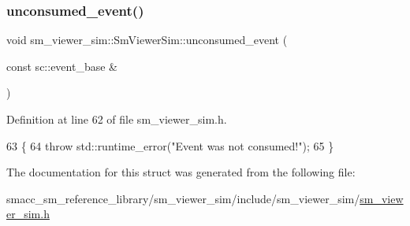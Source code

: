 \subsubsection{\texorpdfstring{unconsumed\+\_\+event()}{unconsumed\_event()}}
{\footnotesize\ttfamily void sm\+\_\+viewer\+\_\+sim\+::\+Sm\+Viewer\+Sim\+::unconsumed\+\_\+event (\begin{DoxyParamCaption}\item[{const sc\+::event\+\_\+base \&}]{ }\end{DoxyParamCaption})\hspace{0.3cm}{\ttfamily [inline]}}



Definition at line 62 of file sm\+\_\+viewer\+\_\+sim.\+h.


\begin{DoxyCode}
63     \{
64         \textcolor{keywordflow}{throw} std::runtime\_error(\textcolor{stringliteral}{"Event was not consumed!"});
65     \}
\end{DoxyCode}


The documentation for this struct was generated from the following file\+:\begin{DoxyCompactItemize}
\item 
smacc\+\_\+sm\+\_\+reference\+\_\+library/sm\+\_\+viewer\+\_\+sim/include/sm\+\_\+viewer\+\_\+sim/\hyperlink{sm__viewer__sim_8h}{sm\+\_\+viewer\+\_\+sim.\+h}\end{DoxyCompactItemize}
